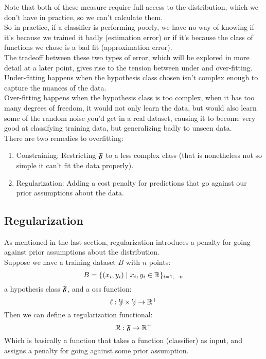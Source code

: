 \documentclass[12pt]{article}
\begin{document}
Note that both of these measure require
full access to the distribution,
which we don't have in practice,
so we can't calculate them. \\
So in practice, if a classifier is performing
poorly, we have no way of knowing 
if it's because we trained it badly
(estimation error)
or if it's because the class of functions 
we chose is a bad fit (approximation error). \\

The tradeoff between these two types of
error, which will be explored in more detail
at a later point,
gives rise to the tension between under and
over-fitting. \\

Under-fitting happens when the hypothesis class
chosen isn't complex enough to capture the
nuances of the data. \\

Over-fitting happens when the hypothesis
class is too complex, when it has too many 
degrees of freedom,
it would not only learn the data,
but would also learn some of the random noise
you'd get in a real dataset,
causing it to become very good at classifying
training data, but generalizing badly to 
unseen data. \\

There are two remedies to overfitting:
\begin{enumerate}
    \item 
    Constraining: Restricting $\mathfrak{F}$
    to a less complex class (that is nonetheless
    not so simple it can't fit the data properly). 
    \item 
    Regularization: Adding a cost penalty
    for predictions that go against our 
    prior assumptions about the data. \\
\end{enumerate}

\newpage

\subsection*{Regularization}

As mentioned in the last section,
regularization introduces a penalty
for going against prior assumptions about the
distribution. \\

Suppose we have a training dataset $B$ 
with $n$ points:
\[ B = \{(x_i, y_i) \mid 
x_i, y_i \in \mathbb{R} \}_{i = 1, \dots n} \]
a hypothesis class $\mathfrak{F}$,
and a oss function:
\[ \ell: \mathcal{Y} \times \mathcal{Y} \to \mathbb{R}^+ \]
Then we can define a regularization functional:
\[ \mathcal{R}: \mathfrak{F} \to \mathbb{R}^+ \]
Which is basically a function that takes
a function (classifier) as input,
and assigns a penalty for going against some
prior assumption. \\
\end{document}
